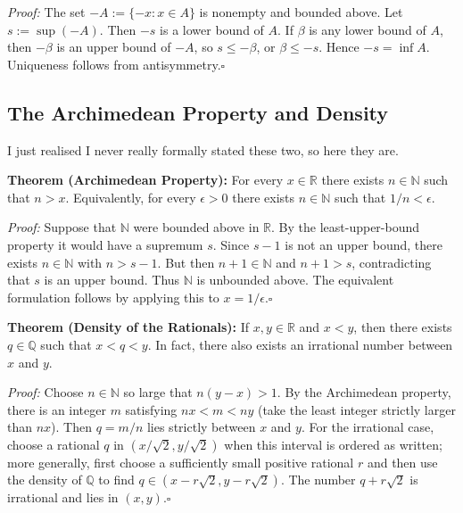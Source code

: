 \documentclass[a4paper,11pt,abstracton]{scrartcl}
\newcommand{\RR}{\mathbb{R}}
\newcommand{\NN}{\mathbb{N}}
\newcommand{\QQ}{\mathbb{Q}}
\theoremstyle{dotlessP}
\theoremstyle{dotlessS}
\theoremstyle{remark}
\theoremstyle{definition}
\begin{document}
\begin{claim_box}
\textit{Proof:} The set $-A:=\{-x:x\in A\}$ is nonempty and bounded
above. Let $s:=\sup(-A)$. Then $-s$ is a lower bound of $A$. If
$\beta$ is any lower bound of $A$, then $-\beta$ is an upper bound
of $-A$, so $s\le-\beta$, or $\beta\le-s$. Hence $-s=\inf A$.
Uniqueness follows from antisymmetry.\hfill$\square$
\end{claim_box}

\subsection{The Archimedean Property and Density}

I just realised I never really formally stated these two, so here they are.

\begin{problem_box}
\textbf{Theorem (Archimedean Property):} For every $x\in\RR$ there
exists $n\in\NN$ such that $n>x$. Equivalently, for every
$\epsilon>0$ there exists $n\in\NN$ such that $1/n<\epsilon$.
\end{problem_box}

\begin{claim_box}
\textit{Proof:} Suppose that $\NN$ were bounded above in $\RR$. By the
least-upper-bound property it would have a supremum $s$. Since $s-1$
is not an upper bound, there exists $n\in\NN$ with $n>s-1$. But then
$n+1\in\NN$ and $n+1>s$, contradicting that $s$ is an upper bound.
Thus $\NN$ is unbounded above. The equivalent formulation follows by
applying this to $x=1/\epsilon$.\hfill$\square$
\end{claim_box}

\begin{problem_box}
\textbf{Theorem (Density of the Rationals):} If $x,y\in\RR$ and
$x<y$, then there exists $q\in\QQ$ such that $x<q<y$. In fact, there
also exists an irrational number between $x$ and $y$.
\end{problem_box}

\begin{claim_box}
\textit{Proof:} Choose $n\in\NN$ so large that $n(y-x)>1$.
By the Archimedean property, there is an integer $m$ satisfying
$nx<m<ny$ (take the least integer strictly larger than $nx$).
Then $q=m/n$ lies strictly between $x$ and $y$. For the irrational
case, choose a rational $q$ in $(x/\sqrt2,y/\sqrt2)$ when this interval
is ordered as written; more generally, first choose a sufficiently
small positive rational $r$ and then use the density of $\QQ$ to find
$q\in(x-r\sqrt2,y-r\sqrt2)$. The number $q+r\sqrt2$ is irrational
and lies in $(x,y)$.\hfill$\square$
\end{claim_box}
\end{document}
